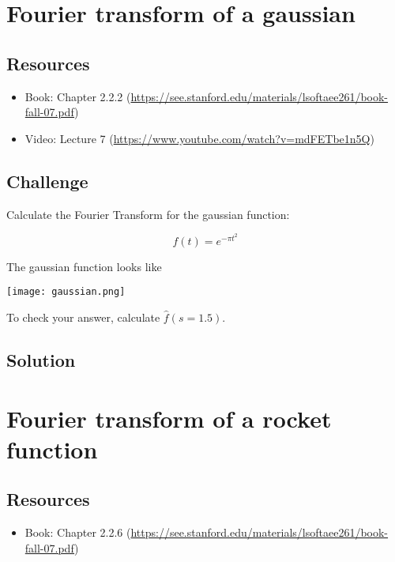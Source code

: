 \newpage
\section{Fourier transform of a gaussian}

\subsection*{Resources}
\begin{itemize}
    \item Book: Chapter 2.2.2 (\url{https://see.stanford.edu/materials/lsoftaee261/book-fall-07.pdf})
    \item Video: Lecture 7 (\url{https://www.youtube.com/watch?v=mdFETbe1n5Q})
\end{itemize}

\subsection*{Challenge}
Calculate the Fourier Transform for the gaussian function:

\begin{equation}
    f(t) = e^{-\pi t^2}
\end{equation}

The gaussian function looks like

\texttt{[image: gaussian.png]}

To check your answer, calculate $\hat{f}(s=1.5)$.

\subsection*{Solution}




\newpage
\section{Fourier transform of a rocket function}

\subsection*{Resources}
\begin{itemize}
    \item Book: Chapter 2.2.6 (\url{https://see.stanford.edu/materials/lsoftaee261/book-fall-07.pdf})
\end{itemize}

